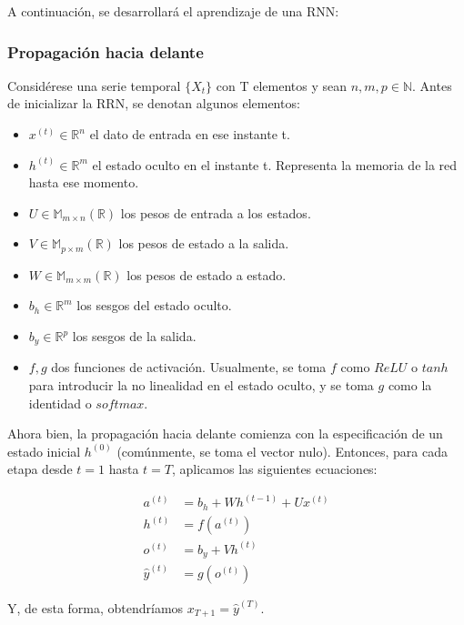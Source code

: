 \documentclass[12pt,twoside]{article}
\begin{document}
A continuación, se desarrollará el aprendizaje \cite{rnn2} de una RNN:

\subsubsection{Propagación hacia delante}\label{sec:15}


Considérese una serie temporal $\{X_t\}$ con T elementos y sean $n,m,p \in \mathbb{N}$. Antes de inicializar la RRN, se denotan algunos elementos: 

\begin{itemize}
    \item $x^{(t)} \in \mathbb{R}^n$ el dato de entrada en ese instante t.
    \item $h^{(t)} \in \mathbb{R}^m$ el estado oculto en el instante t. Representa la memoria de la red hasta ese momento.
    \item $U \in \mathbb{M}_{m \times n}(\mathbb{R})$ los pesos de entrada a los estados.
    \item $V \in \mathbb{M}_{p \times m}(\mathbb{R})$ los pesos de estado a la salida.
    \item $W \in \mathbb{M}_{m \times m}(\mathbb{R})$ los pesos de estado a estado.
    \item $b_h \in \mathbb{R}^m$ los sesgos del estado oculto.
    \item $b_y \in \mathbb{R}^p$ los sesgos de la salida.
    \item $f,g$ dos funciones de activación. Usualmente, se toma $f$ como $ReLU$ o $tanh$ para introducir la no linealidad en el estado oculto, y se toma $g$ como la identidad o $softmax$.
\end{itemize}

Ahora bien, la propagación hacia delante comienza con la especificación de un estado inicial $h^{(0)}$ (comúnmente, se toma el vector nulo). Entonces, para cada etapa desde $t=1$ hasta $t=T$, aplicamos las siguientes ecuaciones: 

\begin{equation}
\begin{aligned}
a^{(t)} &= b_h + W h^{(t-1)} + U x^{(t)} \\
h^{(t)} &= f(a^{(t)}) \\
o^{(t)} &= b_y + V h^{(t)} \\
\hat{y}^{(t)} &= g(o^{(t)})
\end{aligned}
\end{equation}


Y, de esta forma, obtendríamos $x_{T+1}=\hat{y}^{(T)}$.
\end{document}
